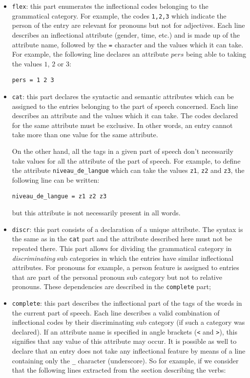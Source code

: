 \begin{itemize}
  \item \verb$flex$: this part enumerates the inflectional
  codes belonging to the grammatical category. For example, the codes
  \verb$1,2,3$ which indicate the person of the entry are relevant for pronouns
  but not for adjectives. Each line describes an inflectional attribute (gender,
  time, etc.) and is made up of the attribute name, followed by the \verb$=$
  character and the values which it can take. For example, the following line
  declares an attribute $pers$ being able to taking the values $1$, $2$ or $3$:

\begin{verbatim}
pers = 1 2 3
\end{verbatim}

\item \verb$cat$: this part declares the syntactic and semantic
attributes which can be assigned to the entries belonging to the part of speech
concerned. Each line describes an attribute and the values which it can take. The
codes declared for the same attribute must be exclusive. In other words, an entry
cannot take more than one value for the same attribute.

On the other hand, all the tags in a given part of speech don't necessarily take
values for all the attribute of the part of speech. For example, to define the
attribute \verb$niveau_de_langue$ which can take the values \verb$z1$, \verb$z2$
and \verb$z3$, the following line can be written:


\begin{verbatim}
niveau_de_langue = z1 z2 z3
\end{verbatim}

but this attribute is not necessarily present in all words.

\item \verb$discr$: this part consists of a declaration of a
unique attribute. The syntax is the same as in the \verb$cat$ part and the
attribute described here must not be repeated there. This part allows for
dividing the grammatical category in \textit{discriminating} sub categories in
which the entries have similar inflectional attributes. For pronouns for example,
a person feature is assigned to entries that are part of the personal pronoun sub
category but not to relative pronouns. These dependencies are described in the
\verb$complete$ part;

\item \verb$complete$: this part describes the
inflectional part of the tags of the words in the current part of speech. Each
line describes a valid combination of inflectional codes by their discriminating
sub category (if such a category was declared). If an attribute name is specified
in angle brackets (\verb$<$ and \verb$>$), this signifies that any value of this
attribute may occur. It is possible as well to declare that an entry does not
take any inflectional feature by means of a line containing only the \verb$_$
character (underscore).\index{\verbc{_}} So for example, if we consider that the
following lines extracted from the section describing the verbs:



\end{itemize}

